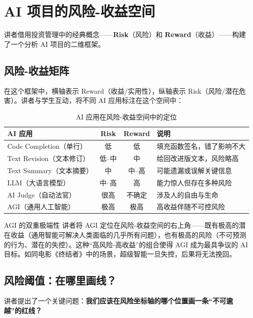 \section{AI 项目的风险-收益空间}

讲者借用投资管理中的经典概念——\textbf{Risk}（风险）和 \textbf{Reward}（收益）——构建了一个分析 AI 项目的二维框架。

\subsection{风险-收益矩阵}

在这个框架中，横轴表示 Reward（收益/实用性），纵轴表示 Risk（风险/潜在危害）。讲者与学生互动，将不同 AI 应用标注在这个空间中：

\begin{table}[H]
\centering
\caption{AI 应用在风险-收益空间中的定位}
\begin{tabular}{@{}lccl@{}}
\toprule
\textbf{AI 应用} & \textbf{Risk} & \textbf{Reward} & \textbf{说明} \\
\midrule
Code Completion（单行） & 低 & 低 & 填充函数签名，错了影响不大 \\
Text Revision（文本修订） & 低--中 & 中 & 给回改进版文本，风险略高 \\
Text Summary（文本摘要） & 中 & 中--高 & 可能遗漏或误解关键信息 \\
LLM（大语言模型） & 中--高 & 高 & 能力惊人但存在多种风险 \\
AI Judge（自动法官） & 很高 & 不确定 & 涉及人的自由与生命 \\
AGI（通用人工智能） & 极高 & 极高 & 高收益伴随不可控风险 \\
\bottomrule
\end{tabular}
\end{table}

\begin{warningbox}{AGI 的双重极端性}
讲者将 AGI 定位在风险-收益空间的右上角——既有极高的潜在收益（通用智能可解决人类面临的几乎所有问题），也有极高的风险（不可预测的行为、潜在的失控）。这种``高风险-高收益''的组合使得 AGI 成为最具争议的 AI 目标。如同电影《终结者》中的场景，超级智能一旦失控，后果将无法挽回。
\end{warningbox}

\subsection{风险阈值：在哪里画线？}

讲者提出了一个关键问题：\textbf{我们应该在风险坐标轴的哪个位置画一条``不可逾越''的红线？}

